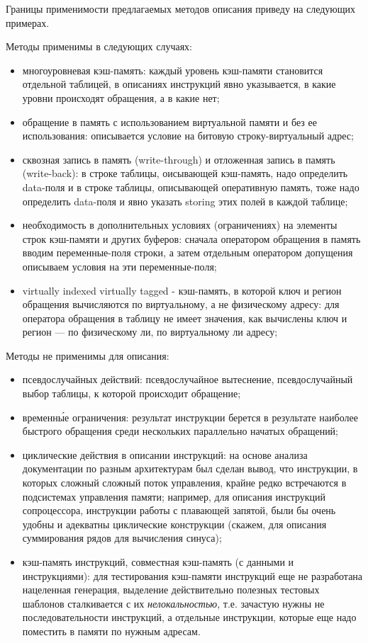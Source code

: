 \documentclass[14pt]{extreport}
\begin{document}
Границы применимости предлагаемых методов описания приведу на следующих примерах.

Методы применимы в следующих случаях:
\begin{itemize}
    \item многоуровневая кэш-память: каждый уровень кэш-памяти становится отдельной таблицей, в описаниях инструкций явно указывается, в какие уровни происходят обращения, а в какие нет;
    \item обращение в память с использованием виртуальной памяти и без ее использования: описывается условие на битовую строку-виртуальный адрес;
    \item сквозная запись в память (write-through) и отложенная запись в память (write-back): в строке таблицы, оисывающей кэш-память, надо определить data-поля и в строке таблицы, описывающей оперативную память, тоже надо определить data-поля и явно указать storing этих полей в каждой таблице;
    \item необходимость в дополнительных условиях (ограничениях) на элементы строк кэш-памяти и других буферов: сначала оператором обращения в память вводим переменные-поля строки, а затем отдельным оператором допущения описываем условия на эти переменные-поля;
    \item virtually indexed virtually tagged - кэш-память, в которой ключ и регион обращения вычисляются по виртуальному, а не физическому адресу: для оператора обращения в таблицу не имеет значения, как вычислены ключ и регион --- по физическому ли, по виртуальному ли адресу;
\end{itemize}


Методы не применимы для описания:
\begin{itemize}
    \item псевдослучайных действий: псевдослучайное вытеснение, псевдослучайный выбор таблицы, к которой происходит обращение;
    \item временн\'{ы}е ограничения: результат инструкции берется в результате наиболее быстрого обращения среди нескольких параллельно начатых обращений;
    \item циклические действия в описании инструкций: на основе анализа документации по разным архитектурам был сделан вывод, что инструкции, в которых сложный сложный поток управления, крайне редко встречаются в подсистемах управления памяти; например, для описания инструкций сопроцессора, инструкции работы с плавающей запятой, были бы очень удобны и адекватны циклические конструкции (скажем, для описания суммирования рядов для вычисления синуса);
    \item кэш-память инструкций, совместная кэш-память (с данными и инструкциями): для тестирования кэш-памяти инструкций еще не разработана нацеленная генерация, выделение действительно полезных тестовых шаблонов сталкивается с их \emph{нелокальностью}, т.е. зачастую нужны не последовательности инструкций, а отдельные инструкции, которые еще надо поместить в памяти по нужным адресам.
\end{itemize}
\end{document}
